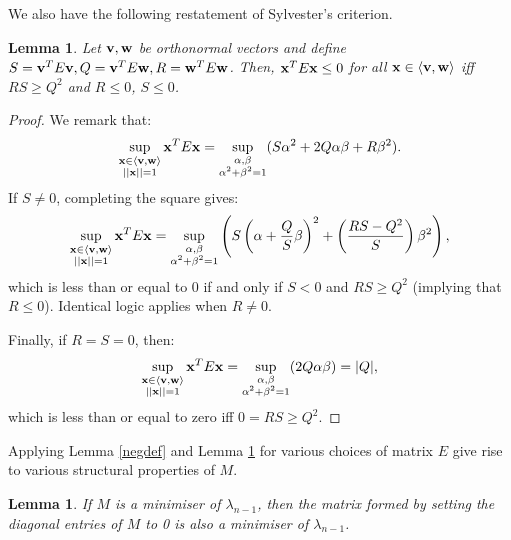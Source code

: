 \documentclass[12pt]{article}
\newtheorem{lmm}[thm]{Lemma}
\begin{document}
We also have the following restatement of Sylvester’s criterion.
\begin{lmm} \label{SQR} Let $\bold{v,w}$ be orthonormal vectors and define $S = \bold{v}^TE\bold{v}, Q = \bold{v}^TE\bold{w}, R = \bold{w}^TE\bold{w}$. Then, $\bold{x}^TE\bold{x}\le 0$ for all $\bold{x}\in \braket{\bold{v,w}}$ iff $RS\ge Q^2$ and $R\le 0$, $S\le 0$. 
\end{lmm}
\begin{proof} We remark that:
\begin{equation*}
    \sup_{\substack{\bold{x} \in \braket{\bold{v,w}} \\ ||\bold{x}|| = 1}}\bold{x}^T E\bold{x} = \sup_{\substack{\alpha, \beta \\ \alpha^2 + \beta^2 = 1}} (S\alpha^2 + 2Q\alpha\beta + R\beta^2).
\end{equation*}
If $S\ne 0$, completing the square gives:
\begin{equation*}
    \sup_{\substack{\bold{x} \in \braket{\bold{v,w}} \\ ||\bold{x}|| = 1}}\bold{x}^T E\bold{x} = \sup_{\substack{\alpha, \beta \\ \alpha^2 + \beta^2 = 1}} \left( S\left(\alpha + \frac{Q}{S}\beta\right)^2 + \left(\frac{RS-Q^2}{S}\right)\beta^2\right),
\end{equation*}
which is less than or equal to $0$ if and only if $S< 0$ and  $RS \ge Q^2$ (implying that $R \le 0$). Identical logic applies when $R\ne 0$. 

Finally, if $R=S=0$, then:
\begin{equation*}
    \sup_{\substack{\bold{x} \in \braket{\bold{v,w}} \\ ||\bold{x}|| = 1}}\bold{x}^T E\bold{x} = \sup_{\substack{\alpha, \beta \\ \alpha^2 + \beta^2 = 1}} (2Q\alpha\beta) = |Q|,
\end{equation*}
which is less than or equal to zero iff $0=RS\ge Q^2$. 
\end{proof}
Applying Lemma \ref{negdef} and Lemma \ref{SQR} for various choices of matrix $E$ give rise to various structural properties of $M$.
\begin{lmm} \label{diagonal} If $M$ is a minimiser of $\lambda_{n-1}$, then the matrix formed by setting the diagonal entries of $M$ to 0 is also a minimiser of $\lambda_{n-1}$. 
\end{lmm}
\end{document}
